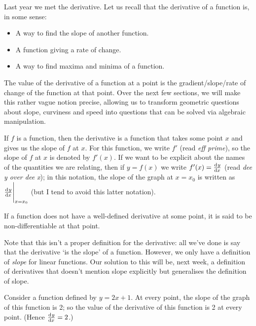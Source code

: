 




Last year we met the derivative. Let us recall that the derivative of a function is, in some sense:
\begin{itemize}
  \item A way to find the slope of another function.
  \item A function giving a rate of change.
  \item A way to find maxima and minima of a function.
\end{itemize}
The value of the derivative of a function at a point is the gradient/slope/rate of change of the function at that
point. Over the next few sections, we will make this rather vague notion precise, allowing us to transform geometric questions
about slope, curviness and speed into questions that can be solved via algebraic manipulation.

If $ f $ is a function, then the derivative is a function that takes some point $ x $ and gives us the slope of $ f $ at $ x $. For this
function, we write $ f' $ (read \emph{eff prime}), so the slope of $ f $ at $ x $ is denoted by $ f'(x) $. If we want to be explicit about the names
of the quantities we are relating, then if $ y = f(x) $ we write $ f'(x) = \od{y}{x} $ (read \emph{dee y over dee x}); in this notation,
the slope of the graph at $ x = x_0 $ is written as $ \eval{\od{y}{x}}_{x = x_0} $ (but I tend to avoid this latter notation).

If a function does not have a well-defined derivative at some point, it is said to be non-differentiable at that point.

\begin{rem}
  Note that this isn't a proper definition for the derivative: all we've done is say that the derivative `is the slope' of a function. However,
  we only have a definition of \emph{slope} for linear functions. Our solution to this will be, next week, a definition of derivatives that doesn't
  mention slope explicitly but generalises the definition of slope.
\end{rem}

\begin{ex}
  Consider a function defined by $ y = 2x + 1 $. At every point, the slope of the graph of this function is 2; so
  the value of the derivative of this function is 2 at every point. (Hence $ \od{y}{x} = 2 $.)
\end{ex}

